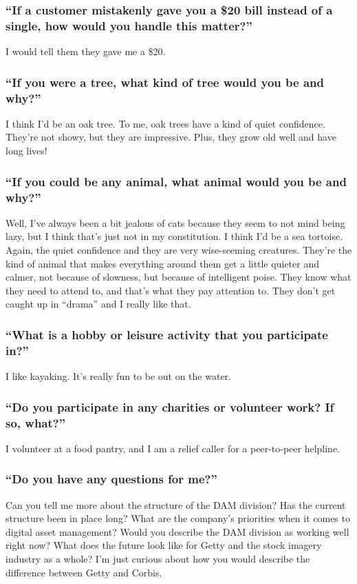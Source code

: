 \subsubsection*{``If a customer mistakenly gave you a \$20 bill instead of a single, how would you handle this matter?''}
\break I would tell them they gave me a \$20.

\subsubsection*{``If you were a tree, what kind of tree would you be and why?''}
\break I think I'd be an oak tree. To me, oak trees have a kind of quiet confidence. They're not showy, but they are impressive. Plus, they grow old well and have long lives!

\subsubsection*{``If you could be any animal, what animal would you be and why?''}
\break Well, I've always been a bit jealous of cats because they seem to not mind being lazy, but I think that's just not in my constitution. I think I'd be a sea tortoise. Again, the quiet confidence and they are very wise-seeming creatures. They're the kind of animal that makes everything around them get a little quieter and calmer, not because of slowness, but because of intelligent poise. They know what they need to attend to, and that's what they pay attention to. They don't get caught up in ``drama'' and I really like that.

\subsubsection*{``What is a hobby or leisure activity that you participate in?'' }
\break I like kayaking. It's really fun to be out on the water.

\subsubsection*{``Do you participate in any charities or volunteer work? If so, what?''}
\break I volunteer at a food pantry, and I am a relief caller for a peer-to-peer helpline.

\subsubsection*{``Do you have any questions for me?''}
\break Can you tell me more about the structure of the DAM division?
\break Has the current structure been in place long?
\break What are the company's priorities when it comes to digital asset management?
\break Would you describe the DAM division as working well right now?
\break What does the future look like for Getty and the stock imagery industry as a whole?
\break I'm just curious about how you would describe the difference between Getty and Corbis.



